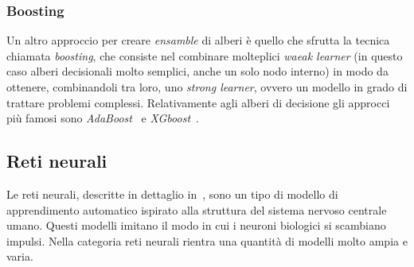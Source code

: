 \subsubsection{Boosting}
Un altro approccio per creare \emph{ensamble} di alberi è quello che sfrutta la tecnica chiamata \emph{boosting}, che consiste nel combinare molteplici \emph{waeak learner} (in questo caso alberi decisionali molto semplici, anche un solo nodo interno) in modo da ottenere, combinandoli tra loro, uno \emph{strong learner}, ovvero un modello in grado di trattare problemi complessi.
Relativamente agli alberi di decisione gli approcci più famosi sono \emph{AdaBoost}~\cite{adaboost} e \emph{XGboost}~\cite{xgboost}.


\subsection{Reti neurali}
Le reti neurali, descritte in dettaglio in~\cite{neural_networks}, sono un tipo di modello di apprendimento automatico ispirato alla struttura del sistema nervoso centrale umano.
Questi modelli imitano il modo in cui i neuroni biologici si scambiano impulsi.
Nella categoria reti neurali rientra una quantità di modelli molto ampia e varia.

